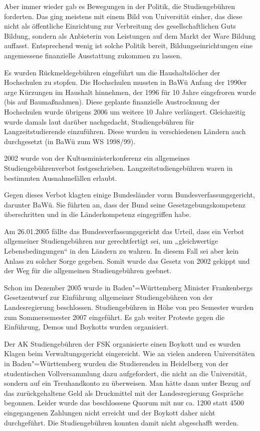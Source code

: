 Aber immer wieder gab es Bewegungen in der Politik, die Studiengebühren
forderten. Das ging meistens mit einem Bild von Universität einher, das diese
nicht als öffentliche Einrichtung zur Verbreitung des gesellschaftlichen Guts
Bildung, sondern als Anbieterin von Leistungen auf dem Markt der Ware Bildung
auffasst. Entsprechend wenig ist solche Politik bereit, Bildungseinrichtungen
eine angemessene finanzielle Ausstattung zukommen zu lassen.

Es wurden Rückmeldegebühren eingeführt um die Haushaltslöcher der Hochschulen
zu stopfen. Die Hochschulen mussten in BaWü Anfang der 1990er arge Kürzungen im
Haushalt hinnehmen, der 1996 für 10 Jahre eingefroren wurde (bis auf
Baumaßnahmen). Diese geplante finanzielle Austrocknung der Hochschulen wurde
übrigens 2006 um weitere 10 Jahre verlängert. Gleichzeitig wurde damals laut
darüber nachgedacht, Studiengebühren für Langzeitstudierende einzuführen. Diese
wurden in verschiedenen Ländern auch durchgesetzt (in BaWü zum WS 1998/99).

2002 wurde von der Kultusministerkonferenz ein allgemeines
Studiengebührenverbot festgeschrieben. Langzeitstudiengebühren waren in
bestimmten Ausnahmefällen erlaubt.

Gegen dieses Verbot klagten einige Bundesländer vorm Bundesverfassungsgericht,
darunter BaWü. Sie führten an, dass der Bund seine Gesetzgebungskompetenz
überschritten und in die Länderkompetenz eingegriffen habe.

Am 26.01.2005 fällte das Bundesverfassungsgericht das Urteil, dass ein Verbot
allgemeiner Studiengebühren nur gerechtfertigt sei, um „gleichwertige
Lebensbedingungen“ in den Ländern zu wahren. In diesem Fall sei aber kein
Anlass zu solcher Sorge gegeben. Somit wurde das Gesetz von 2002 gekippt und
der Weg für die allgemeinen Studiengebühren geebnet.

Schon im Dezember 2005 wurde in Baden"=Württemberg Minister Frankenbergs
Gesetzentwurf zur Einführung allgemeiner Studiengebühren von der
Landesregierung beschlossen. Studiengebühren in Höhe von  pro Semester
wurden zum Sommersemester 2007 eingeführt. Es gab weiter Proteste gegen die
Einführung, Demos und Boykotts wurden organisiert.

Der AK Studiengebühren der \gls{FSK} organisierte einen Boykott und es wurden
Klagen beim Verwaltungsgericht eingereicht. Wie an vielen anderen Universitäten
in Baden"=Württemberg wurden die Studierenden in Heidelberg von der
studentischen Vollversammlung dazu aufgefordert, die  nicht an die
Universität, sondern auf ein Treuhandkonto zu überweisen. Man hätte dann unter
Bezug auf das zurückgehaltene Geld als Druckmittel mit der Landesregierung
Gespräche begonnen. Leider wurde das beschlossene Quorum mit nur ca. 1200 statt
4500 eingegangenen Zahlungen nicht erreicht und der Boykott daher nicht
durchgeführt. Die Studiengebühren konnten damit nicht abgeschafft werden.

